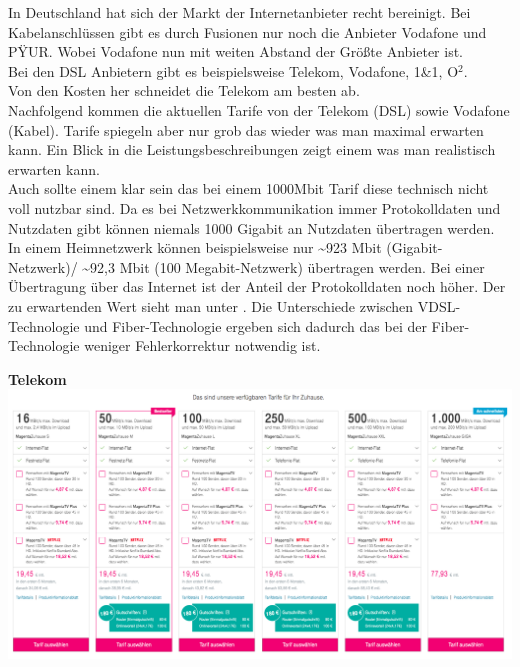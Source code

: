 
In Deutschland hat sich der Markt der Internetanbieter recht bereinigt.
Bei Kabelanschlüssen gibt es durch Fusionen nur noch die Anbieter Vodafone und PŸUR.
Wobei Vodafone nun mit weiten Abstand der Größte Anbieter ist. \\
Bei den DSL Anbietern gibt es beispielsweise Telekom, Vodafone, 1\&1, O$^2$. \\
Von den Kosten her schneidet die Telekom am besten ab. \\
Nachfolgend kommen die aktuellen Tarife von der Telekom (DSL) sowie Vodafone (Kabel).
Tarife spiegeln aber nur grob das wieder was man maximal erwarten kann.
Ein Blick in die Leistungsbeschreibungen zeigt einem was man realistisch erwarten kann.\\
Auch sollte einem klar sein das bei einem 1000Mbit Tarif diese technisch nicht voll nutzbar sind.
Da es bei Netzwerkkommunikation immer Protokolldaten und Nutzdaten gibt können niemals 1000 Gigabit an Nutzdaten übertragen werden.\\

In einem Heimnetzwerk können beispielsweise nur \textasciitilde 923 Mbit (Gigabit-Netzwerk)/ \textasciitilde 92,3 Mbit (100 Megabit-Netzwerk) übertragen werden.
Bei einer Übertragung über das Internet ist der Anteil der Protokolldaten noch höher.
Der zu erwartenden Wert sieht man unter .
Die Unterschiede zwischen VDSL-Technologie und Fiber-Technologie ergeben sich dadurch das bei der Fiber-Technologie weniger Fehlerkorrektur notwendig ist.\\

{}

{\vspace{-0.6cm}}
\begin{center}
  \textbf{Telekom} \\
  \includegraphics[scale=0.35]{./pictures/t-dsl.png}
\end{center}

